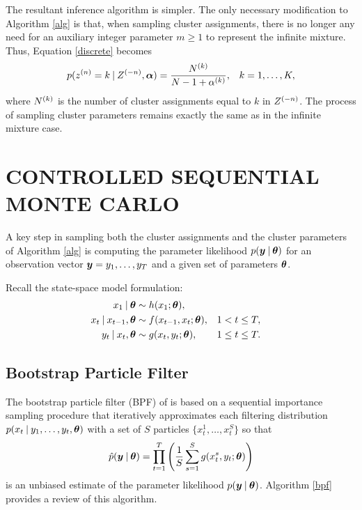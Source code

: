 \documentclass[twoside]{article}
\begin{document}
The resultant inference algorithm is simpler.  The only necessary modification to Algorithm \ref{alg} is that, when sampling cluster assignments, there is no longer any need for an auxiliary integer parameter $m \geq 1$ to represent the infinite mixture.  Thus, Equation \ref{discrete} becomes 
\begin{align*}
p({z}^{(n)}_{} = k \:\vert\: {Z}^{(-n)}_{}, \boldsymbol{\alpha}) = \frac{{N}^{(k)}_{}}{N - 1 + {\alpha}^{(k)}_{}}, & & k = 1, \ldots, K,
\end{align*}
where ${N}^{(k)}_{}$ is the number of cluster assignments equal to $k$ in ${Z}^{(-n)}_{}$.  The process of sampling cluster parameters remains exactly the same as in the infinite mixture case.   

\section{CONTROLLED SEQUENTIAL MONTE CARLO} \label{csmc-app}

A key step in sampling both the cluster assignments and the cluster parameters of Algorithm \ref{alg} is computing the parameter likelihood $p(\boldsymbol{y} \:\vert\: \boldsymbol{\theta})$ for an observation vector $\boldsymbol{y} = y_1, \ldots, y_T$ and a given set of parameters $\boldsymbol{\theta}$.  

Recall the state-space model formulation:
\begin{align*}
x_1 \:\vert\: \boldsymbol{\theta} &\sim h(x_1; \boldsymbol{\theta}), \\
x_t \:\vert\: x_{t-1}, \boldsymbol{\theta} &\sim f(x_{t-1}, x_t; \boldsymbol{\theta}),  & &1 < t \leq T, \\
y_t \:\vert\: x_t, \boldsymbol{\theta} &\sim g(x_t, y_t; \boldsymbol{\theta}), & & 1 \leq t \leq T.
\end{align*}

\subsection{Bootstrap Particle Filter}

The bootstrap particle filter (BPF) of \cite{doucet2001introduction} is based on a sequential importance sampling procedure that iteratively approximates each filtering distribution $p(x_t \:\vert\: y_1, \ldots, y_t, \boldsymbol{\theta})$ with a set of $S$ particles $\{x_t^1, \ldots, x_t^S\}$ so that
\begin{align*}
\hat{p}(\boldsymbol{y} \:\vert\: \boldsymbol{\theta}) = \prod_{t=1}^T \left(\frac{1}{S}\sum_{s=1}^S g(x_t^s, y_t; \boldsymbol{\theta})\right)
\end{align*}  
is an unbiased estimate of the parameter likelihood $p(\boldsymbol{y} \:\vert\: \boldsymbol{\theta})$.  Algorithm \ref{bpf} provides a review of this algorithm.
\end{document}
